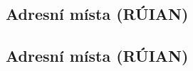 \documentclass[a4paper, 12pt]{article}
\begin{document}
\subsection{Adresní místa (RÚIAN)}

\subsection{Adresní místa (RÚIAN)}


\clearpage
\begin{comment}
\section{Aplikace}
V následují kapitole je představen vizuální vzhled vytvořené aplikace tak, jak ji vidí prostý uživatel.

\begin{figure}[h!]
	\centering
	\texttt{[image: ./pictures/app\_default.png]}
	\caption{Výchozí vzhled aplikace po spuštění}
\end{figure}

\begin{figure}[h!]
	\centering
	\texttt{[image: ./pictures/app\_load\_points.png]}
	\caption{Aplikace po nahrání vstupních dat}
\end{figure}

\begin{figure}[h!]
	\centering
	\texttt{[image: ./pictures/app\_delaunay.png]}
	\caption{Trojúhelníková síť}
\end{figure}

\begin{figure}[h!]
	\centering
	\texttt{[image: ./pictures/app\_contours.png]}
	\caption{Vykreslení vrstevnic}
\end{figure}

\begin{figure}[h!]
	\centering
	\texttt{[image: ./pictures/app\_slope.png]}
	\caption{Sklon trojúhelníků}
\end{figure}

\begin{figure}[h!]
	\centering
	\texttt{[image: ./pictures/app\_aspect.png]}
	\caption{Orientace trojúhelníků}
\end{figure}
\clearpage


\subsection{Plošina}
\begin{figure}[h!]
	\centering
	\texttt{[image: ./pictures/kupec\_plateau\_contours.png]}
	\texttt{[image: ./pictures/kupec\_plateau\_slope.png]}
	\caption{Plošina vytvořená aplikací}
\end{figure}


\end{comment}
\end{document}
